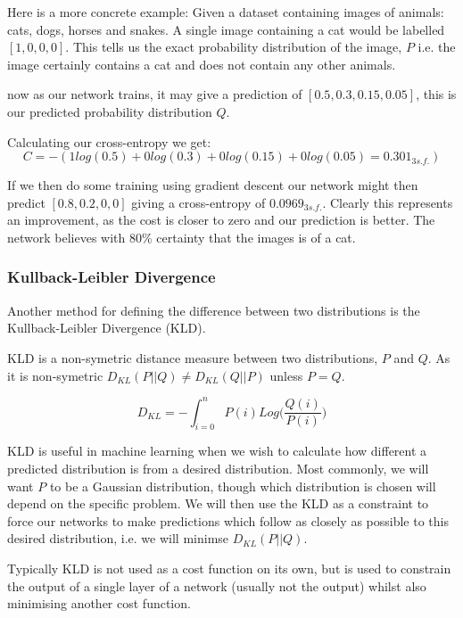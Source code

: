 Here is a more concrete example:
Given a dataset containing images of animals: cats, dogs, horses and snakes. A single image containing a cat would be labelled $[1, 0, 0, 0]$. This tells us the exact probability distribution of the image, $P$ i.e. the image certainly contains a cat and does not contain any other animals.

now as our network trains, it may give a prediction of $[0.5, 0.3, 0.15, 0.05]$, this is our predicted probability distribution $Q$.

Calculating our cross-entropy we get:
\begin{equation}
C = -(1 log(0.5) + 0 log(0.3) + 0 log(0.15) + 0 log(0.05) = 0.301_{3s.f.})
\label{eqn:xentrpy_eg}
\end{equation}

If we then do some training using gradient descent our network might then predict $[0.8, 0.2, 0, 0]$ giving a cross-entropy of $0.0969_{3s.f.}$. Clearly this represents an improvement, as the cost is closer to zero and our prediction is better. The network believes with 80\% certainty that the images is of a cat. 


\subsubsection{Kullback-Leibler Divergence}

Another method for defining the difference between two distributions is the Kullback-Leibler Divergence (KLD).

KLD is a non-symetric distance measure between two distributions, $P$ and $Q$. As it is non-symetric $D_{KL}(P||Q) \neq D_{KL}(Q||P)$ unless $P = Q$.

\begin{equation}
D_{KL} = -\int_{i=0}^{n}{P(i)Log(\frac{Q(i)}{P(i)}})
\label{eqn:kld}
\end{equation}

KLD is useful in machine learning when we wish to calculate how different a predicted distribution is from a desired distribution. Most commonly, we will want $P$ to be a Gaussian distribution, though which distribution is chosen will depend on the specific problem. We will then use the KLD as a constraint to force our networks to make predictions which follow as closely as possible to this desired distribution, i.e. we will minimse $D_{KL}(P||Q)$.

Typically KLD is not used as a cost function on its own, but is used to constrain the output of a single layer of a network (usually not the output) whilst also minimising another cost function.

